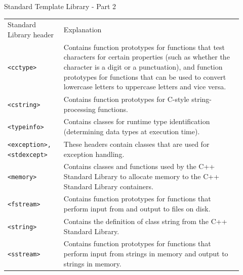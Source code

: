 \documentclass[10pt]{beamer}
\begin{document}
\begin{frame}
	{Standard Template Library - Part 2}
	\centering\scriptsize\renewcommand{\arraystretch}{2}
	\begin{tabular}{p{0.22\linewidth} p{0.7\linewidth}}
		
		\rowcolor{cyan}\color{white} Standard Library header & \color{white} Explanation\\
		
		\rowcolor{lightcyan} \texttt{<cctype>} & Contains function prototypes for functions that test characters for certain properties (such as whether the character is a digit or a punctuation), and function prototypes for functions that can be used to convert
		lowercase letters to uppercase letters and vice versa. \\
		\rowcolor{lightcyan} \texttt{<cstring>} & Contains function prototypes for C-style string-processing functions. \\
		\rowcolor{lightcyan} \texttt{<typeinfo>} & Contains classes for runtime type identification (determining data types	at execution time). \\
		\rowcolor{lightcyan} \texttt{<exception>, <stdexcept>} & These headers contain classes that are used for exception handling. \\
		\rowcolor{lightcyan} \texttt{<memory>} & Contains classes and functions used by the C++ Standard Library to allocate memory to the C++ Standard Library containers. \\
		\rowcolor{lightcyan} \texttt{<fstream>} & Contains function prototypes for functions that perform input from and output to files on disk. \\
		\rowcolor{lightcyan} \texttt{<string>} & Contains the definition of class string from the C++ Standard Library. \\
		\rowcolor{lightcyan} \texttt{<sstream>} & Contains function prototypes for functions that perform input from strings in memory and output to strings in memory.	
	\end{tabular}
\end{frame}
\end{document}
